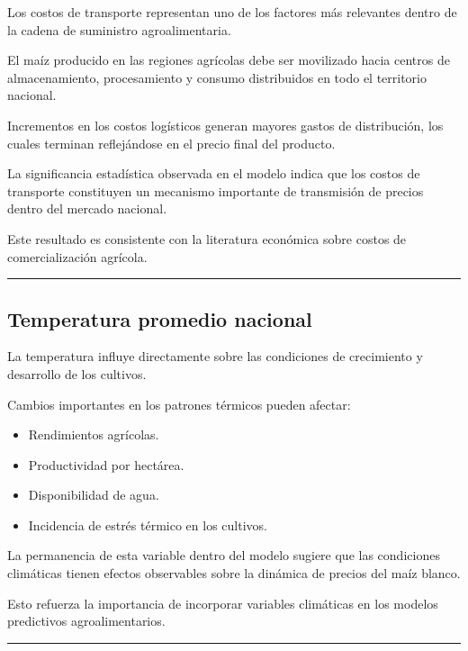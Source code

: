 \documentclass[11pt]{article}
\providecommand{\tightlist}{%
      \setlength{\itemsep}{0pt}\setlength{\parskip}{0pt}}
\begin{document}
Los costos de transporte representan uno de los factores más relevantes
dentro de la cadena de suministro agroalimentaria.

El maíz producido en las regiones agrícolas debe ser movilizado hacia
centros de almacenamiento, procesamiento y consumo distribuidos en todo
el territorio nacional.

Incrementos en los costos logísticos generan mayores gastos de
distribución, los cuales terminan reflejándose en el precio final del
producto.

La significancia estadística observada en el modelo indica que los
costos de transporte constituyen un mecanismo importante de transmisión
de precios dentro del mercado nacional.

Este resultado es consistente con la literatura económica sobre costos
de comercialización agrícola.

\begin{center}\rule{0.5\linewidth}{0.5pt}\end{center}

\hypertarget{temperatura-promedio-nacional}{%
\subsection{Temperatura promedio
nacional}\label{temperatura-promedio-nacional}}

La temperatura influye directamente sobre las condiciones de crecimiento
y desarrollo de los cultivos.

Cambios importantes en los patrones térmicos pueden afectar:

\begin{itemize}
\tightlist
\item
  Rendimientos agrícolas.
\item
  Productividad por hectárea.
\item
  Disponibilidad de agua.
\item
  Incidencia de estrés térmico en los cultivos.
\end{itemize}

La permanencia de esta variable dentro del modelo sugiere que las
condiciones climáticas tienen efectos observables sobre la dinámica de
precios del maíz blanco.

Esto refuerza la importancia de incorporar variables climáticas en los
modelos predictivos agroalimentarios.

\begin{center}\rule{0.5\linewidth}{0.5pt}\end{center}
\end{document}
